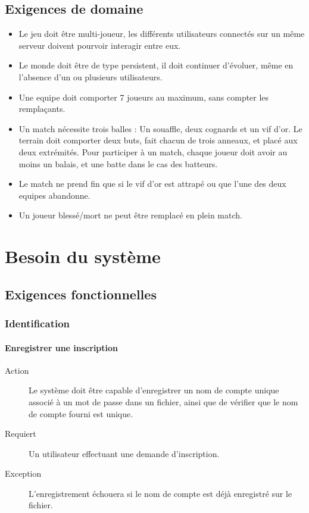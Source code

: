 \documentclass[a4paper]{article}
\begin{document}

\subsection{Exigences de domaine}
\begin{itemize}
\item Le jeu doit être multi-joueur, les différents \glspl{utilisateur} connectés sur un même \gls{serveur} doivent pourvoir interagir entre eux.
\item Le monde doit être de type persistent, il doit continuer d'évoluer, même en l'absence d'un ou plusieurs \glspl{utilisateur}.
\item Une \gls{equipe} doit comporter 7 \glspl{joueur} au maximum, sans compter les remplaçants.
\item Un match nécessite trois balles : Un souaffle, deux cognards et un vif d'or. Le terrain doit comporter deux buts, fait chacun de trois anneaux, et placé aux deux extrémités. Pour participer à un match, chaque \gls{joueur} doit avoir au moins un balais, et une batte dans le cas des batteurs.
\item Le match ne prend fin que si le vif d'or est attrapé ou que l'une des deux \glspl{equipe} abandonne.
\item Un \gls{joueur} blessé/mort ne peut être remplacé en plein match.
\end{itemize}


\section{Besoin du système}
\subsection{Exigences fonctionnelles}

\subsubsection{Identification}
\paragraph{Enregistrer une inscription}
\begin{description}
\item[Action] Le système doit être capable d'enregistrer un nom de compte unique associé à un mot de passe dans un fichier, ainsi que de vérifier que le nom de compte fourni est unique.
\item[Requiert] Un \gls{utilisateur} effectuant une demande d'inscription.
\item[Exception] L'enregistrement échouera si le nom de compte est déjà enregistré sur le fichier.
\end{description}
\end{document}
